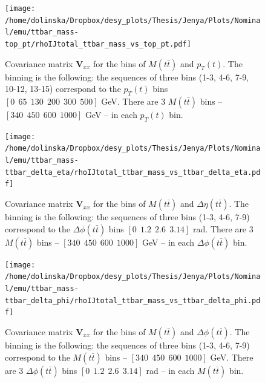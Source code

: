 
\begin{figure}[p]
  \centering
  \texttt{[image: /home/dolinska/Dropbox/desy\_plots/Thesis/Jenya/Plots/Nominal/emu/ttbar\_mass-top\_pt/rhoIJtotal\_ttbar\_mass\_vs\_top\_pt.pdf]}
  \caption{Covariance matrix $\mathbf{V}_{xx}$ for the bins of $M(t\bar{t})$ and $p_{T}(t)$. The binning is the following:
  the sequences of three bins (1-3, 4-6, 7-9, 10-12, 13-15) correspond to the $p_{T}(t)$ bins $[0\:\:65\:\:130\:\:200\:\:300\:\:500]$ GeV.
          There are 3 $M(t\bar{t})$ bins -- $[340\:\:450\:\:600\:\:1000]$ GeV -- in each $p_{T}(t)$ bin.}
  \label{fig:corr_matr_Mtt_pt}
\end{figure}

\begin{figure}[p]
  \centering
  \texttt{[image: /home/dolinska/Dropbox/desy\_plots/Thesis/Jenya/Plots/Nominal/emu/ttbar\_mass-ttbar\_delta\_eta/rhoIJtotal\_ttbar\_mass\_vs\_ttbar\_delta\_eta.pdf]}
  \caption{Covariance matrix $\mathbf{V}_{xx}$ for the bins of $M(t\bar{t})$ and $\Delta\eta(t\bar{t})$. The binning is the following:
  the sequences of three bins (1-3, 4-6, 7-9) correspond to the $\Delta\phi(t\bar{t})$ bins $[0\:\:1.2\:\:2.6\:\:3.14]$ rad.
          There are 3 $M(t\bar{t})$ bins -- $[340\:\:450\:\:600\:\:1000]$ GeV -- in each $\Delta\phi(t\bar{t})$ bin.}
  \label{fig:corr_matr_eta_Mtt}
\end{figure}

\begin{figure}[p]
  \centering
  \texttt{[image: /home/dolinska/Dropbox/desy\_plots/Thesis/Jenya/Plots/Nominal/emu/ttbar\_mass-ttbar\_delta\_phi/rhoIJtotal\_ttbar\_mass\_vs\_ttbar\_delta\_phi.pdf]}
  \caption{Covariance matrix $\mathbf{V}_{xx}$ for the bins of $M(t\bar{t})$ and $\Delta\phi(t\bar{t})$. The binning is the following:
  the sequences of three bins (1-3, 4-6, 7-9) correspond to the $M(t\bar{t})$ bins -- $[340\:\:450\:\:600\:\:1000]$ GeV.
          There are 3 $\Delta\phi(t\bar{t})$ bins $[0\:\:1.2\:\:2.6\:\:3.14]$ rad -- in each $M(t\bar{t})$ bin.}
  \label{fig:corr_matr_phi_Mtt}
\end{figure}


